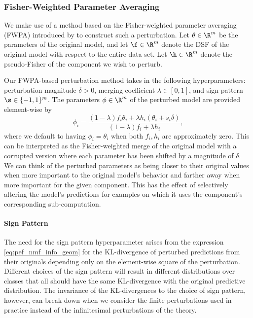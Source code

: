 \documentclass[dvipsnames]{article}
\begin{document}
\subsubsection{Fisher-Weighted Parameter Averaging}
We make use of a method based on the Fisher-weighted parameter averaging (FWPA) introduced by \citet{matena2021merging} to construct such a perturbation.
Let $\theta \in \R^m$ be the parameters of the original model, and let $\f \in \R^m$ denote the DSF of the original model with respect to the entire data set.
Let $\h\in\R^m$ denote the pseudo-Fisher of the component we wish to perturb.

Our FWPA-based perturbation method takes in the following hyperparameters: perturbation magnitude $\delta > 0$, merging coefficient $\lambda \in [0, 1]$, and sign-pattern $\s \in \{-1,1\}^m$.
The parameters $\phi\in\R^m$ of the perturbed model are provided element-wise by
\begin{equation}\label{eq:fwpa_perturb}
    \phi_i = \frac{(1 - \lambda) f_i \theta_i + \lambda h_i(\theta_i + s_i \delta)}{(1 - \lambda) f_i + \lambda h_i},
\end{equation}
where we default to having $\phi_i = \theta_i$ when both $f_i,h_i$ are approximately zero.
This can be interpreted as the Fisher-weighted merge of the original model with a corrupted version where each parameter has been shifted by a magnitude of $\delta$.
We can think of the perturbed parameters as being closer to their original values when more important to the original model's behavior and farther away when more important for the given component.
This has the effect of selectively altering the model's predictions for examples on which it uses the component's corresponding sub-computation.

\paragraph{Sign Pattern}

The need for the sign pattern hyperparameter arises from the expression \eqref{eq:pef_nmf_info_geom} for the KL-divergence of perturbed predictions from their originals depending only on the element-wise square of the perturbation.
Different choices of the sign pattern will result in different distributions over classes that all should have the same KL-divergence with the original predictive distribution.
The invariance of the KL-divergences to the choice of sign pattern, however, can break down when we consider the finite perturbations used in practice instead of the infinitesimal perturbations of the theory.
\end{document}
